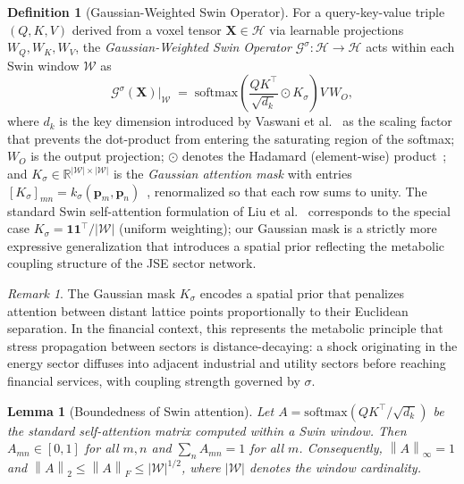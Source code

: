 \documentclass[11pt,a4paper]{article}  %
\newcommand{\R}{\mathbb{R}}
\newcommand{\Hilbert}{\mathcal{H}}
\newcommand{\Gop}{\mathcal{G}^{\sigma}}
\newcommand{\norm}[1]{\left\lVert#1\right\rVert}
\newcommand{\abs}[1]{\left\lvert#1\right\rvert}
\theoremstyle{plain}
\newtheorem{lemma}[theorem]{Lemma}
\theoremstyle{definition}
\newtheorem{definition}{Definition}[section]
\theoremstyle{remark}
\newtheorem{remark}{Remark}[section]
\begin{document}
\begin{definition}[Gaussian-Weighted Swin Operator]
\label{def:gwsop}
For a query-key-value triple $(Q,K,V)$ derived from a voxel tensor
$\mathbf{X}\in\Hilbert$ via learnable projections $W_Q,W_K,W_V$,
the \emph{Gaussian-Weighted Swin Operator}
$\Gop:\Hilbert\to\Hilbert$ acts within each Swin window $\mathcal{W}$
as
\begin{equation}
   \Gop(\mathbf{X})\big|_{\mathcal{W}}
   \;=\; \mathrm{softmax}\!\left(
      \frac{Q K^{\top}}{\sqrt{d_k}} \odot K_\sigma
   \right) V \, W_O,
   \label{eq:gwsop}
\end{equation}
where $d_k$ is the key dimension introduced by Vaswani et al.~\cite{Vaswani2017}
as the scaling factor that prevents the dot-product from entering
the saturating region of the softmax; $W_O$ is the output projection;
$\odot$ denotes the Hadamard (element-wise) product~\cite{Horn1990};
and $K_\sigma\in\R^{\abs{\mathcal{W}}\times\abs{\mathcal{W}}}$ is the
\emph{Gaussian attention mask} with entries
$[K_\sigma]_{mn} = k_\sigma(\mathbf{p}_m,\mathbf{p}_n)$~\cite{Rasmussen2006}, renormalized
so that each row sums to unity. The standard Swin self-attention
formulation of Liu et al.~\cite{Liu2021} corresponds to the special
case $K_\sigma = \mathbf{1}\mathbf{1}^{\top}/\abs{\mathcal{W}}$
(uniform weighting); our Gaussian mask is a strictly more
expressive generalization that introduces a spatial prior reflecting
the metabolic coupling structure of the JSE sector network.
\end{definition}

\begin{remark}
The Gaussian mask $K_\sigma$ encodes a spatial prior that penalizes
attention between distant lattice points proportionally to their
Euclidean separation. In the financial context, this represents the
metabolic principle that stress propagation between sectors is
distance-decaying: a shock originating in the energy sector diffuses
into adjacent industrial and utility sectors before reaching financial
services, with coupling strength governed by $\sigma$.
\end{remark}

\begin{lemma}[Boundedness of Swin attention]
\label{lem:bounded}
Let $A = \mathrm{softmax}(Q K^{\top}/\sqrt{d_k})$ be the standard
self-attention matrix computed within a Swin window. Then
$A_{mn}\in[0,1]$ for all $m,n$ and $\sum_n A_{mn} = 1$ for all $m$.
Consequently, $\norm{A}_{\infty} = 1$ and
$\norm{A}_2 \leq \norm{A}_F \leq \abs{\mathcal{W}}^{1/2}$,
where $\abs{\mathcal{W}}$ denotes the window cardinality.
\end{lemma}
\end{document}
